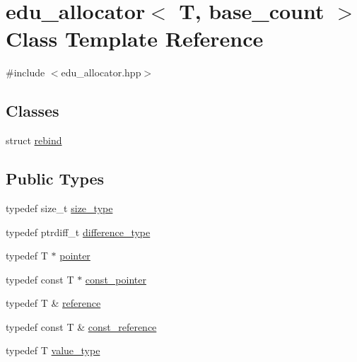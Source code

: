 \hypertarget{classedu__allocator}{}\section{edu\+\_\+allocator$<$ T, base\+\_\+count $>$ Class Template Reference}
\label{classedu__allocator}


{\ttfamily \#include $<$edu\+\_\+allocator.\+hpp$>$}

\subsection*{Classes}
\begin{DoxyCompactItemize}
\item 
struct \hyperlink{structedu__allocator_1_1rebind}{rebind}
\end{DoxyCompactItemize}
\subsection*{Public Types}
\begin{DoxyCompactItemize}
\item 
typedef size\+\_\+t \hyperlink{classedu__allocator_aa140c3e2a9364dcbc207fa148b5c1deb}{size\+\_\+type}
\item 
typedef ptrdiff\+\_\+t \hyperlink{classedu__allocator_a7c64dafebaa7cde1a37248caba0226ca}{difference\+\_\+type}
\item 
typedef T $\ast$ \hyperlink{classedu__allocator_a735857fd1d42cae69aef990a62e597cf}{pointer}
\item 
typedef const T $\ast$ \hyperlink{classedu__allocator_aabb40d46b7dfb72ce0c3eed984a771fa}{const\+\_\+pointer}
\item 
typedef T \& \hyperlink{classedu__allocator_ad2c2e48954832a74ab522ad2093dfaba}{reference}
\item 
typedef const T \& \hyperlink{classedu__allocator_aa0ca747c0a96c4b00eec6c6a93d329e7}{const\+\_\+reference}
\item 
typedef T \hyperlink{classedu__allocator_ac2a6b2105b188c027d63daa51068f991}{value\+\_\+type}
\end{DoxyCompactItemize}
